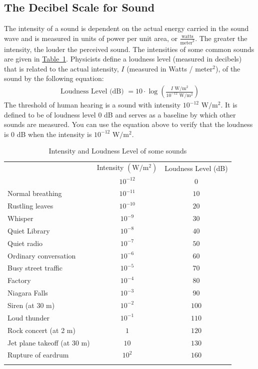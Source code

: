 \documentclass[10pt,]{book}
\theoremstyle{plain}
\theoremstyle{definition}
\theoremstyle{definition}
\theoremstyle{definition}
\numberwithin{equation}{section}
\newcommand{\hrulemedium}{\noalign{\hrule height 0.07em}}
\newcommand{\hrulethick} {\noalign{\hrule height 0.11em}}
\begin{document}
\subsection[{The Decibel Scale for Sound}]{The Decibel Scale for Sound}\label{subsection-1}
\hypertarget{p-309}{}%
The intensity of a sound is dependent on the actual energy carried in the sound wave and is measured in units of power per unit area, or \(\frac{ \text{watts} }{ \text{meter} ^2}\).  The greater the intensity, the louder the perceived sound. The intensities of some common sounds are given in \hyperref[decibel-table]{Table~1}.  Physicists define a loudness level (measured in decibels) that is related to the actual intensity, \(I\) (measured in Watts / meter\(^2\)), of the sound by the following equation:%
\begin{gather*}
\text{Loudness Level (dB) } = 10 \cdot \log \left( \frac{I  \text{ W} / \text{m}^2 } {10^{-12} \text{ W} / \text{m}^2 }  \right)
\end{gather*}
The threshold of human hearing is a sound with intensity \(10^{-12} \text{ W} / \text{m}^2\). It is defined to be of loudness level \(0\) dB and serves as a baseline by which other sounds are measured. You can use the equation above to verify that the loudness is \(0\) dB when the intensity is \(10^{-12} \text{ W} / \text{m}^2\).%
\begin{table}
\centering
\begin{tabular}{ccc}\hrulethick
\multicolumn{1}{l}{Sound}&Intensity \(\left( \text{W} / \text{m}^2 \right)\)&Loudness Level (dB)\tabularnewline\hrulemedium
\multicolumn{1}{l}{Threshold of hearing}&\(10^{-12}\)&\(0\)\tabularnewline[0pt]
\multicolumn{1}{l}{Normal breathing}&\(10^{-11}\)&\(10\)\tabularnewline[0pt]
\multicolumn{1}{l}{Rustling leaves}&\(10^{-10}\)&\(20\)\tabularnewline[0pt]
\multicolumn{1}{l}{Whisper}&\(10^{-9}\)&\(30\)\tabularnewline[0pt]
\multicolumn{1}{l}{Quiet Library}&\(10^{-8}\)&\(40\)\tabularnewline[0pt]
\multicolumn{1}{l}{Quiet radio}&\(10^{-7}\)&\(50\)\tabularnewline[0pt]
\multicolumn{1}{l}{Ordinary conversation}&\(10^{-6}\)&\(60\)\tabularnewline[0pt]
\multicolumn{1}{l}{Busy street traffic}&\(10^{-5}\)&\(70\)\tabularnewline[0pt]
\multicolumn{1}{l}{Factory}&\(10^{-4}\)&\(80\)\tabularnewline[0pt]
\multicolumn{1}{l}{Niagara Falls}&\(10^{-3}\)&\(90\)\tabularnewline[0pt]
\multicolumn{1}{l}{Siren (at 30 m)}&\(10^{-2}\)&\(100\)\tabularnewline[0pt]
\multicolumn{1}{l}{Loud thunder}&\(10^{-1}\)&\(110\)\tabularnewline[0pt]
\multicolumn{1}{l}{Rock concert (at 2 m)}&\(1\)&\(120\)\tabularnewline[0pt]
\multicolumn{1}{l}{Jet plane takeoff (at 30 m)}&\(10\)&\(130\)\tabularnewline[0pt]
\multicolumn{1}{l}{Rupture of eardrum}&\(10^{2}\)&\(160\)\tabularnewline\hrulethick
\end{tabular}
\caption{Intensity and Loudness Level of some sounds\label{decibel-table}}
\end{table}
\end{document}
